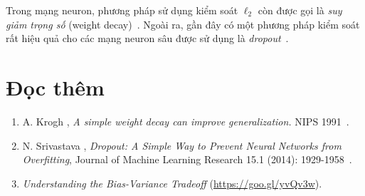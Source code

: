 




Trong mạng neuron, phương pháp sử dụng kiểm soát $\ell_2$ còn được gọi là \textit{suy giảm trọng số} (weight decay)~\cite{krogh1992simple}. Ngoài ra, gần đây có một phương pháp kiểm soát rất hiệu quả cho các mạng neuron sâu được sử dụng là \textit{dropout}~\cite{srivastava2014dropout}.

\section{Đọc thêm}
\begin{enumerate}
\item A. Krogh \etal, \textit{A simple weight decay can improve generalization.} NIPS 1991~\cite{krogh1992simple}.

\item N. Srivastava \etal, \textit{Dropout: A Simple Way to Prevent Neural
Networks from  Overfitting}, Journal of Machine Learning Research 15.1
(2014): 1929-1958~\cite{srivastava2014dropout}.

\item \textit{Understanding the Bias-Variance Tradeoff} (\url{https://goo.gl/yvQv3w}).

\end{enumerate}
